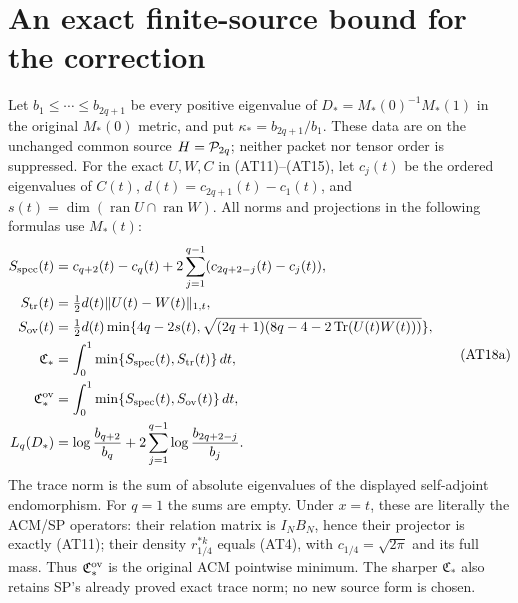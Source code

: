 \section{An exact finite-source bound for the correction}

Let $b_1\le\cdots\le b_{2q+1}$ be every positive eigenvalue of
$D_*=M_*(0)^{-1}M_*(1)$ in the original $M_*(0)$ metric, and put
$\kappa_*=b_{2q+1}/b_1$. These data are on the unchanged common
source $H=\mathcal P_{2q}$; neither packet nor tensor order is suppressed.
For the exact $U,W,C$ in (AT11)--(AT15), let $c_j(t)$ be the
ordered eigenvalues of $C(t)$, $d(t)=c_{2q+1}(t)-c_1(t)$, and
$s(t)=\dim(\operatorname{ran}U\cap\operatorname{ran}W)$. All norms
and projections in the following formulas use $M_*(t)$:
\[
\begin{aligned}
S_{\rm spec}(t)&=c_{q+2}(t)-c_q(t)
 +2\sum_{j=1}^{q-1}(c_{2q+2-j}(t)-c_j(t)),\\
S_{\rm tr}(t)&=\tfrac12d(t)\|U(t)-W(t)\|_{1,t},\\
S_{\rm ov}(t)&=\tfrac12d(t)\min\{4q-2s(t),
 \sqrt{(2q+1)(8q-4-2\operatorname{Tr}(U(t)W(t)))}\},\\
\mathfrak C_*&=\int_0^1\min\{S_{\rm spec}(t),S_{\rm tr}(t)\}\,dt,\\
\mathfrak C_*^{\rm ov}&=\int_0^1\min\{S_{\rm spec}(t),S_{\rm ov}(t)\}\,dt,\\
L_q(D_*)&=\log\frac{b_{q+2}}{b_q}
 +2\sum_{j=1}^{q-1}\log\frac{b_{2q+2-j}}{b_j}.
\end{aligned}\tag{AT18a}
\]
The trace norm is the sum of absolute eigenvalues of the displayed
self-adjoint endomorphism. For $q=1$ the sums are empty. Under
$x=t$, these are literally the ACM/SP operators: their relation
matrix is $I_NB_N$, hence their projector is exactly (AT11);
their density $r_{1/4}^{*k}$ equals (AT4), with
$c_{1/4}=\sqrt{2\pi}$ and its full mass. Thus
$\mathfrak C_*^{\rm ov}$ is the original ACM pointwise minimum.
The sharper $\mathfrak C_*$ also retains SP's already proved exact
trace norm; no new source form is chosen.

